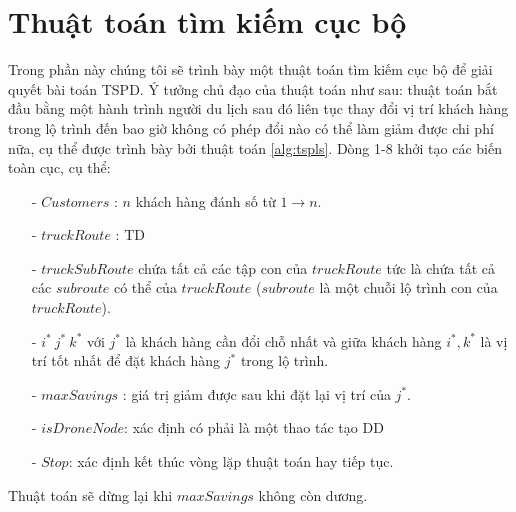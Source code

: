\documentclass[a4paper,12pt]{report}
\begin{document}
\section{Thuật toán tìm kiếm cục bộ}
\label{section:tsp-ls}
Trong phần này chúng tôi sẽ trình bày một thuật toán tìm kiếm cục bộ để giải quyết bài toán TSPD. Ý tưởng chủ đạo của thuật toán như sau: thuật toán bắt đầu bằng một hành trình người du lịch sau đó liên tục thay đổi vị trí khách hàng trong lộ trình đến bao giờ không có phép đổi nào có thể làm giảm được chi phí nữa, cụ thể được trình bày bởi thuật toán \ref{alg:tspls}. Dòng 1-8 khởi tạo các biến toàn cục, cụ thể:
\begin{itemize}
\item[-] $Customers$ : $n$ khách hàng đánh số từ $1\rightarrow n$.
\item[-] $truckRoute$ : \ac{TD}
\item[-] $truckSubRoute$ chứa  tất cả các tập con của $truckRoute$ tức là chứa tất cả các $subroute$ có thể của $truckRoute$ ($subroute$ là một chuỗi lộ trình con của $truckRoute$).
\item[-] $i^* \ j^* \ k^*$ với $j^*$ là khách hàng cần đổi chỗ nhất và giữa khách hàng $i^* ,k^*$ là vị trí tốt nhất để đặt khách hàng $j^*$ trong lộ trình.
\item[-] $maxSavings$ : giá trị giảm được sau khi đặt lại vị trí của $j^*$.
\item[-] $isDroneNode$: xác định có phải là một thao tác tạo \ac{DD}
\item[-] $Stop$: xác định kết thúc vòng lặp thuật toán hay tiếp tục.
\end{itemize}
Thuật toán sẽ dừng lại khi $maxSavings$ không còn dương. \\
\end{document}
